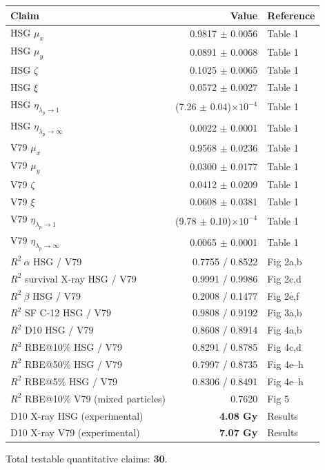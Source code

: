 \documentclass[11pt]{article}
\begin{document}
\begin{longtable}{p{} r p{}}
\toprule
\textbf{Claim} & \textbf{Value} & \textbf{Reference} \\
\midrule
\endhead
HSG $\mu_x$ & 0.9817 $\pm$ 0.0056 & Table 1 \\
HSG $\mu_y$ & 0.0891 $\pm$ 0.0068 & Table 1 \\
HSG $\zeta$ & 0.1025 $\pm$ 0.0065 & Table 1 \\
HSG $\xi$ & 0.0572 $\pm$ 0.0027 & Table 1 \\
HSG $\eta_{\lambda_p\to 1}$ & (7.26 $\pm$ 0.04)$\times 10^{-4}$ & Table 1 \\
HSG $\eta_{\lambda_p\to\infty}$ & 0.0022 $\pm$ 0.0001 & Table 1 \\
V79 $\mu_x$ & 0.9568 $\pm$ 0.0236 & Table 1 \\
V79 $\mu_y$ & 0.0300 $\pm$ 0.0177 & Table 1 \\
V79 $\zeta$ & 0.0412 $\pm$ 0.0209 & Table 1 \\
V79 $\xi$ & 0.0608 $\pm$ 0.0381 & Table 1 \\
V79 $\eta_{\lambda_p\to 1}$ & (9.78 $\pm$ 0.10)$\times 10^{-4}$ & Table 1 \\
V79 $\eta_{\lambda_p\to\infty}$ & 0.0065 $\pm$ 0.0001 & Table 1 \\
$R^2\ \alpha$ HSG / V79 & 0.7755 / 0.8522 & Fig 2a,b \\
$R^2$ survival X-ray HSG / V79 & 0.9991 / 0.9986 & Fig 2c,d \\
$R^2\ \beta$ HSG / V79 & 0.2008 / 0.1477 & Fig 2e,f \\
$R^2$ SF C-12 HSG / V79 & 0.9808 / 0.9192 & Fig 3a,b \\
$R^2$ D10 HSG / V79 & 0.8608 / 0.8914 & Fig 4a,b \\
$R^2$ RBE@10\% HSG / V79 & 0.8291 / 0.8785 & Fig 4c,d \\
$R^2$ RBE@50\% HSG / V79 & 0.7997 / 0.8735 & Fig 4e--h \\
$R^2$ RBE@5\% HSG / V79 & 0.8306 / 0.8491 & Fig 4e--h \\
$R^2$ RBE@10\% V79 (mixed particles) & 0.7620 & Fig 5 \\
D10 X-ray HSG (experimental) & \textbf{4.08 Gy} & Results \\
D10 X-ray V79 (experimental) & \textbf{7.07 Gy} & Results \\
\bottomrule
\end{longtable}

\noindent Total testable quantitative claims: \textbf{30}.
\end{document}

